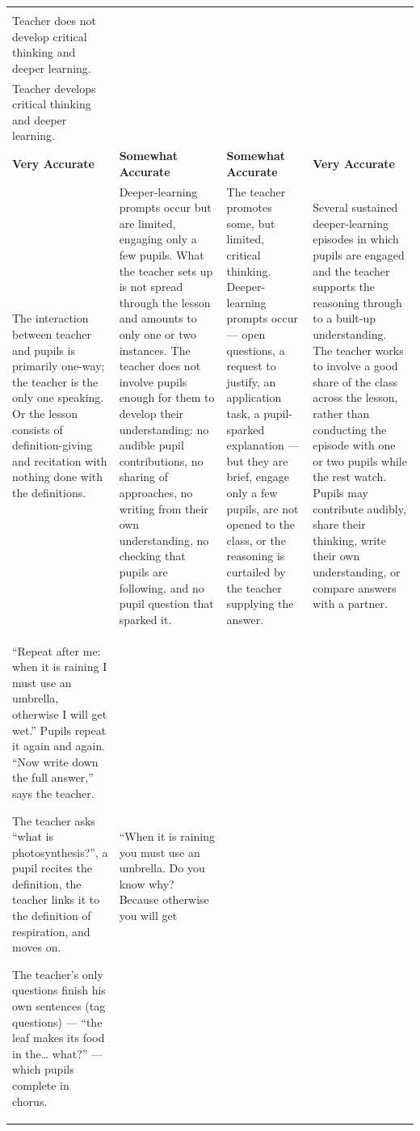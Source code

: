 \documentclass[10pt,a4paper]{article}
\makeatletter
\newcommand{\exlistsize}{\scriptsize}
\renewcommand{\arraystretch}{1.25}
\newlength{\gridw}\newlength{\stemw}\newlength{\stemh}\newlength{\stemtop}
\newcommand{\stemrow}[2]{%
  \setlength{\stemtop}{1.15\ht\strutbox}%
  \setlength{\stemw}{0.5\dimexpr\gridw-2\arrayrulewidth\relax}%
  \sbox{\stemAbox}{\begin{minipage}[t]{\dimexpr\stemw-4.4mm\relax}\RaggedRight
      \footnotesize\textbf{Column A}\\#1\end{minipage}}%
  \sbox{\stemBbox}{\begin{minipage}[t]{\dimexpr\stemw-4.4mm\relax}\RaggedRight
      \footnotesize\textbf{Column B}\\#2\end{minipage}}%
  \setlength{\stemh}{\dimexpr\ht\stemAbox+\dp\stemAbox\relax}%
  \ifdim\dimexpr\ht\stemBbox+\dp\stemBbox\relax>\stemh
    \setlength{\stemh}{\dimexpr\ht\stemBbox+\dp\stemBbox\relax}\fi
  \setlength{\stemh}{\dimexpr\stemtop+\stemh+2.6mm\relax}%
  \begin{tikzpicture}[inner sep=0pt,outer sep=0pt,baseline=0pt]
    \shade[left color=gradA,middle color=gradM,right color=gradB]
      (0,\stemtop) rectangle (\dimexpr\gridw-2\arrayrulewidth\relax,
                              \dimexpr\stemtop-\stemh\relax);
    \draw[black,line width=\arrayrulewidth]
      (\stemw,\stemtop) -- (\stemw,\dimexpr\stemtop-\stemh\relax);
    \node[anchor=north west] at (2.2mm,\dimexpr\stemtop-1.2mm\relax)
      {\usebox{\stemAbox}};
    \node[anchor=north west] at (\dimexpr\stemw+2.2mm\relax,
                                 \dimexpr\stemtop-1.2mm\relax)
      {\usebox{\stemBbox}};
  \end{tikzpicture}}
\newcommand{\scoregrid}[4]{%
  \setlength{\gridw}{\linewidth}%
  \renewcommand{\arraystretch}{1.06}%
  \noindent\footnotesize
  \begin{tabularx}{\linewidth}{|>{\RaggedRight\arraybackslash}X
                               |>{\RaggedRight\arraybackslash}X
                               |>{\RaggedRight\arraybackslash}X
                               |>{\RaggedRight\arraybackslash}X|}
  \hline
  \multicolumn{4}{|@{}l@{}|}{\stemrow{#1}{#2}}\\
  \hline
  \rowcolor{tsub}
  \centering\arraybackslash\textbf{Very Accurate} &
  \centering\arraybackslash\textbf{Somewhat Accurate} &
  \centering\arraybackslash\textbf{Somewhat Accurate} &
  \centering\arraybackslash\textbf{Very Accurate}\\
  \hline
  #3\\
  \hline
  \rowcolor{texfill} #4\\
  \hline
  \end{tabularx}\normalsize}
\makeatother
\begin{document}
\scoregrid{Teacher does not develop critical thinking and deeper learning.}%
          {Teacher develops critical thinking and deeper learning.}{%
\footnotesize The interaction between teacher and pupils is primarily one-way; the teacher is the only one
speaking. Or the lesson consists of definition-giving and recitation with nothing done with the definitions. &
\footnotesize Deeper-learning prompts occur but are limited, engaging only a few pupils. What the teacher
sets up is not spread through the lesson and amounts to only one or two instances. The teacher does not
involve pupils enough for them to develop their understanding: no audible pupil contributions, no sharing of
approaches, no writing from their own understanding, no checking that pupils are following, and no pupil
question that sparked it. &
\footnotesize The teacher promotes some, but limited, critical thinking. Deeper-learning prompts occur ---
open questions, a request to justify, an application task, a pupil-sparked explanation --- but they are
brief, engage only a few pupils, are not opened to the class, or the reasoning is curtailed by the teacher
supplying the answer. &
\footnotesize Several sustained deeper-learning episodes in which pupils are engaged and the teacher
supports the reasoning through to a built-up understanding. The teacher works to involve a good share of the
class across the lesson, rather than conducting the episode with one or two pupils while the rest watch.
Pupils may contribute audibly, share their thinking, write their own understanding, or compare answers with
a partner.
}{%
\exlistsize\begin{exlist}
  \item ``Repeat after me: when it is raining I must use an umbrella, otherwise I will get wet.'' Pupils
        repeat it again and again. ``Now write down the full answer,'' says the teacher.
  \item The teacher asks ``what is photosynthesis?'', a pupil recites the definition, the teacher links it
        to the definition of respiration, and moves on.
  \item The teacher's only questions finish his own sentences (tag questions) --- ``the leaf makes its food in the\ldots{} what?'' --- which pupils complete in chorus.
\end{exlist} &
\exlistsize\begin{exlist}
  \item ``When it is raining you must use an umbrella. Do you know why? Because otherwise you will get

\end{exlist}}
\end{document}
